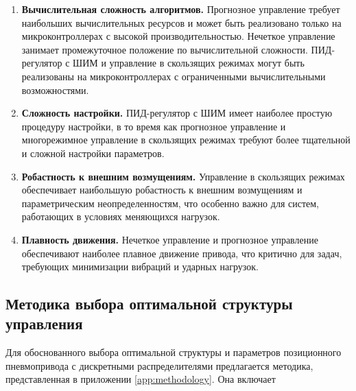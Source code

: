 \begin{enumerate}
	\item \textbf{Вычислительная сложность алгоритмов.} Прогнозное управление требует
	      наибольших вычислительных ресурсов и может быть реализовано только на микроконтроллерах
	      с высокой производительностью. Нечеткое управление занимает промежуточное положение по
	      вычислительной сложности. ПИД-регулятор с ШИМ и управление в скользящих режимах могут
	      быть реализованы на микроконтроллерах с ограниченными вычислительными возможностями.

	\item \textbf{Сложность настройки.} ПИД-регулятор с ШИМ имеет наиболее простую процедуру
	      настройки, в то время как прогнозное управление и многорежимное управление в скользящих
	      режимах требуют более тщательной и сложной настройки параметров.

	\item \textbf{Робастность к внешним возмущениям.} Управление в скользящих режимах
	      обеспечивает наибольшую робастность к внешним возмущениям и параметрическим
	      неопределенностям, что особенно важно для систем, работающих в условиях меняющихся нагрузок.

	\item \textbf{Плавность движения.} Нечеткое управление и прогнозное управление
	      обеспечивают наиболее плавное движение привода, что критично для задач, требующих
	      минимизации вибраций и ударных нагрузок.
\end{enumerate}

\subsection*{Методика выбора оптимальной структуры управления}

Для обоснованного выбора оптимальной структуры и параметров позиционного пневмопривода
с дискретными распределителями предлагается методика, представленная в приложении \ref{app:methodology}. Она включает

